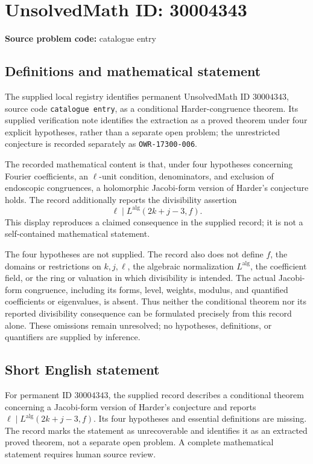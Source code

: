 \documentclass[11pt]{article}
\begin{document}
\section*{UnsolvedMath ID: 30004343}
\textbf{Source problem code:} catalogue entry
\subsection{Definitions and mathematical statement}
The supplied local registry identifies permanent UnsolvedMath ID \(30004343\), source code \texttt{catalogue entry}, as a conditional Harder-congruence theorem. Its supplied verification note identifies the extraction as a proved theorem under four explicit hypotheses, rather than a separate open problem; the unrestricted conjecture is recorded separately as \texttt{OWR-17300-006}.

The recorded mathematical content is that, under four hypotheses concerning Fourier coefficients, an \(\ell\)-unit condition, denominators, and exclusion of endoscopic congruences, a holomorphic Jacobi-form version of Harder's conjecture holds. The record additionally reports the divisibility assertion
\[
\ell\mid L^{\mathrm{alg}}(2k+j-3,f).
\]
This display reproduces a claimed consequence in the supplied record; it is not a self-contained mathematical statement.

The four hypotheses are not supplied. The record also does not define \(f\), the domains or restrictions on \(k,j,\ell\), the algebraic normalization \(L^{\mathrm{alg}}\), the coefficient field, or the ring or valuation in which divisibility is intended. The actual Jacobi-form congruence, including its forms, level, weights, modulus, and quantified coefficients or eigenvalues, is absent. Thus neither the conditional theorem nor its reported divisibility consequence can be formulated precisely from this record alone. These omissions remain unresolved; no hypotheses, definitions, or quantifiers are supplied by inference.
\subsection{Short English statement}
For permanent ID \(30004343\), the supplied record describes a conditional theorem concerning a Jacobi-form version of Harder's conjecture and reports \(\ell\mid L^{\mathrm{alg}}(2k+j-3,f)\). Its four hypotheses and essential definitions are missing. The record marks the statement as unrecoverable and identifies it as an extracted proved theorem, not a separate open problem. A complete mathematical statement requires human source review.
\end{document}
